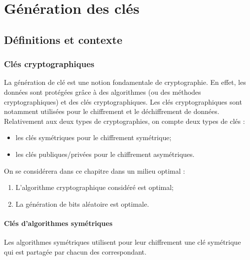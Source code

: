\chapter{Génération des clés}
\section{Définitions et contexte}

\subsection{Clés cryptographiques}

La génération de clé est une notion fondamentale de cryptographie. En effet, les données sont protégées grâce à des algorithmes (ou des méthodes cryptographiques) et des clés cryptographiques. Les clés cryptographiques sont notamment utilisées pour le chiffrement et le déchiffrement de données. 
Relativement aux deux types de cryptographies, on compte deux types de clés : 
\begin{itemize}
\item les clés symétriques pour le chiffrement symétrique;
\item les clés publiques/privées pour le chiffrement asymétriques.\\
\end{itemize}

On se considérera dans ce chapitre dans un milieu optimal : 
\begin{enumerate}
\item L'algorithme cryptographique considéré est optimal;
\item La génération de bits aléatoire est optimale.
\end{enumerate}


\subsubsection{Clés d'algorithmes symétriques}
Les algorithmes symétriques utilisent pour leur chiffrement une clé symétrique qui est partagée par chacun des correspondant. 

